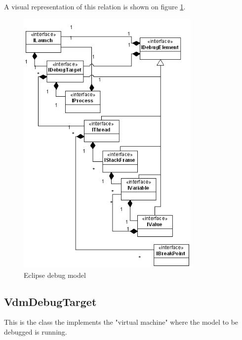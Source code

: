 A visual representation of this relation is shown on figure \ref{fig:debug_model}.
\begin{figure}[htb]
\centering
\includegraphics[width=0.8\textwidth]{figures/debug_model}
\caption{Eclipse debug model}
\label{fig:debug_model}
\end{figure}

\subsection{VdmDebugTarget}

This is the class the implements the "virtual machine" where the model to be debugged is running. 

